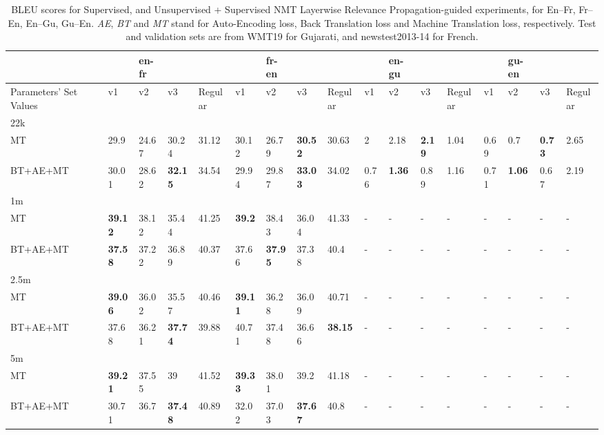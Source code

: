 \begin{table*}[ht]
\tiny
\begin{tabular}{lB lll|l|lll|l|lll|l|lll|l}
\toprule
&&& \textbf{en-fr} & &&  & \textbf{fr-en} & && & \textbf{en-gu} &&&& \textbf{gu-en} && \\\hline
Parameters' Set Values &  & v1 & v2 & v3 &Regular& v1 & v2 & v3 &Regular& v1 & v2    & v3 &Regular& v1 & v2    & v3&Regular \\\hline\hline
22k  &  && &&&   &&&   &&&   & \\\hline
MT  &&29.9&24.67&30.24&31.12&30.12&26.79 &\textbf{30.52}&30.63&2&2.18&\textbf{2.19}&1.04&0.69&0.7 &\textbf{0.73}&2.65 \\
BT+AE+MT &&30.01&28.62&\textbf{32.15}&34.54&29.94&29.87&\textbf{33.03}&34.02&0.76&\textbf{1.36}&0.89&1.16 &0.71&\textbf{1.06}&0.67&2.19\\\hline\hline
1m  & &&&&&&&&&&&&\\\hline
MT & &\textbf{39.12}& 38.12&35.44 &41.25& \textbf{39.2}&38.43&36.04&41.33&-&-&-&-&-&-&-&-\\
BT+AE+MT & & \textbf{37.58}& 37.22& 36.89&40.37& 37.66& \textbf{37.95}& 37.38&40.4&-&-&-&-&-&-&-&-\\\hline\hline
2.5m  &&&&&&&&&&&&   &\\\hline
MT &  &\textbf{39.06}&36.02  &35.57&40.46&\textbf{39.11} &36.28&36.09&40.71&-&-&-&-&-&-&-&-\\
BT+AE+MT &  &37.68 & 36.21& \textbf{37.74} &39.88&40.71&37.48 &36.66& \textbf{38.15}&-&-&-&-&-&-&-&-\\\hline\hline
5m &&&&&&&&&&&&&\\\hline
MT  &&\textbf{39.21} &37.55&39&41.52&\textbf{39.33} &38.01&39.2&41.18&-&-&-&-&-&-&-&-\\
BT+AE+MT &&30.71&36.7&\textbf{37.48}&40.89&32.02 &37.03&\textbf{37.67}&40.8&-&-&-&-&-&-&-&-
\end{tabular}
\hline
\caption{BLEU scores for Supervised, and Unsupervised + Supervised NMT Layerwise Relevance Propagation-guided experiments, for En--Fr, Fr--En, En--Gu, Gu--En. \emph{AE}, \emph{BT} and \emph{MT} stand for Auto-Encoding loss, Back Translation loss and Machine Translation loss, respectively. Test and validation sets are from WMT19 for Gujarati, and newstest2013-14 for French.}
\vspace{-2mm}
\label{table:bleu_results_lrp_train_fr_gu}
\vspace{-0.5em}
\end{table*}